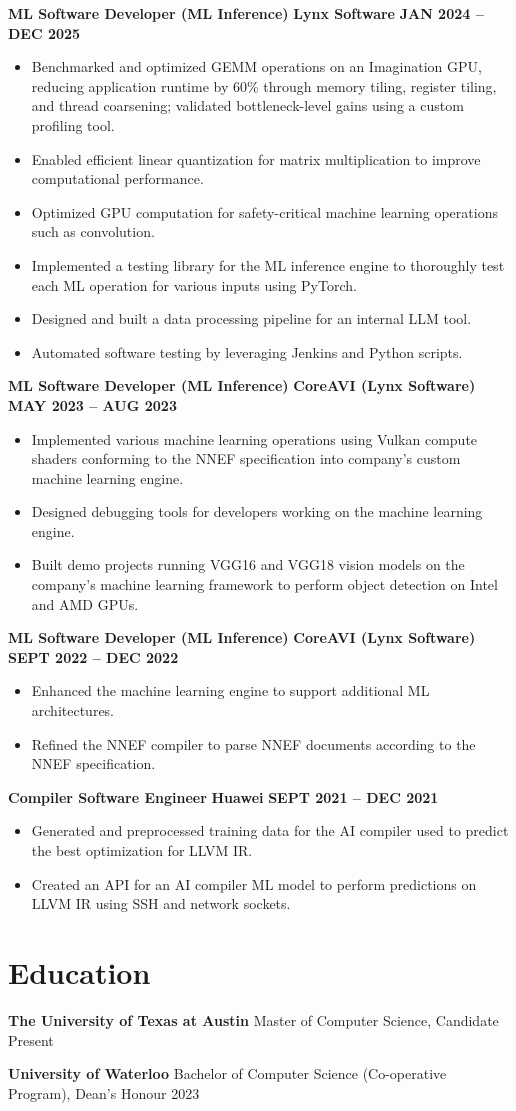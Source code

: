 \documentclass[10pt]{article}
\begin{document}
\textbf{ML Software Developer (ML Inference)} \hfill \textbf{Lynx Software} \hfill \textbf{JAN 2024 -- DEC 2025}
\begin{itemize}
  \item Benchmarked and optimized GEMM operations on an Imagination GPU, reducing application runtime by 60\% through memory tiling, register tiling, and thread coarsening; validated bottleneck-level gains using a custom profiling tool.
  \item Enabled efficient linear quantization for matrix multiplication to improve computational performance.
  \item Optimized GPU computation for safety-critical machine learning operations such as convolution.
  \item Implemented a testing library for the ML inference engine to thoroughly test each ML operation for various inputs using PyTorch.
  \item Designed and built a data processing pipeline for an internal LLM tool.
  \item Automated software testing by leveraging Jenkins and Python scripts.
\end{itemize}

\textbf{ML Software Developer (ML Inference)} \hfill \textbf{CoreAVI (Lynx Software)} \hfill \textbf{MAY 2023 -- AUG 2023}
\begin{itemize}
  \item Implemented various machine learning operations using Vulkan compute shaders conforming to the NNEF specification into company's custom machine learning engine.
  \item Designed debugging tools for developers working on the machine learning engine.
  \item Built demo projects running VGG16 and VGG18 vision models on the company's machine learning framework to perform object detection on Intel and AMD GPUs.
\end{itemize}

\textbf{ML Software Developer (ML Inference)} \hfill \textbf{CoreAVI (Lynx Software)} \hfill \textbf{SEPT 2022 -- DEC 2022}
\begin{itemize}
  \item Enhanced the machine learning engine to support additional ML architectures.
  \item Refined the NNEF compiler to parse NNEF documents according to the NNEF specification.
\end{itemize}

\textbf{Compiler Software Engineer} \hfill \textbf{Huawei} \hfill \textbf{SEPT 2021 -- DEC 2021}
\begin{itemize}
  \item Generated and preprocessed training data for the AI compiler used to predict the best optimization for LLVM IR.
  \item Created an API for an AI compiler ML model to perform predictions on LLVM IR using SSH and network sockets.
\end{itemize}

\section*{Education}
\textbf{The University of Texas at Austin} \hfill Master of Computer Science, Candidate \hfill Present

\textbf{University of Waterloo} \hfill Bachelor of Computer Science (Co-operative Program), Dean's Honour \hfill 2023
\end{document}

